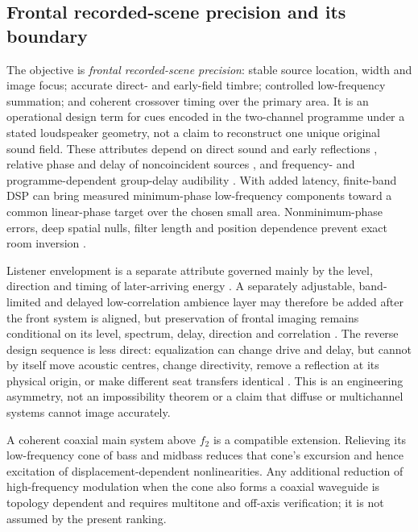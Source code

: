 \subsection{Frontal recorded-scene precision and its boundary}
\label{sec:intro-fidelity}

The objective is \emph{frontal recorded-scene precision}: stable source
location, width and image focus; accurate direct- and early-field timbre;
controlled low-frequency summation; and coherent crossover timing over the
primary area. It is an operational design term for cues encoded in the
two-channel programme under a stated loudspeaker geometry, not a claim to
reconstruct one unique original sound field. These attributes depend on
direct sound and early reflections \cite{toole2006,bech1998}, relative
phase and delay of noncoincident sources \cite{linkwitz1976}, and
frequency- and programme-dependent group-delay audibility
\cite{blauert1978}. With added latency, finite-band DSP can bring measured
minimum-phase low-frequency components toward a common linear-phase target
over the chosen small area. Nonminimum-phase errors, deep spatial nulls,
filter length and position dependence prevent exact room inversion
\cite{neely1979,cecchi2018}.

Listener envelopment is a separate attribute governed mainly by the level,
direction and timing of later-arriving energy
\cite{bradley1995,rumsey2002,soulodre2003}. A separately adjustable, band-limited and
delayed low-correlation ambience layer may therefore be added after the
front system is aligned, but preservation of frontal imaging remains
conditional on its level, spectrum, delay, direction and correlation
\cite{kendall1995,litovsky1999}. The
reverse design sequence is less direct: equalization can change drive and
delay, but cannot by itself move acoustic centres, change directivity,
remove a reflection at its physical origin, or make different seat
transfers identical \cite{neely1979,elliott1989,welti2006,cecchi2018}. This is an engineering
asymmetry, not an impossibility theorem or a claim that diffuse or
multichannel systems cannot image accurately.

A coherent coaxial main system above $f_2$ is a compatible extension.
Relieving its low-frequency cone of bass and midbass reduces that cone's
excursion and hence excitation of displacement-dependent nonlinearities.
Any additional reduction of high-frequency modulation when the cone also
forms a coaxial waveguide is topology dependent and requires multitone and
off-axis verification; it is not assumed by the present ranking.


